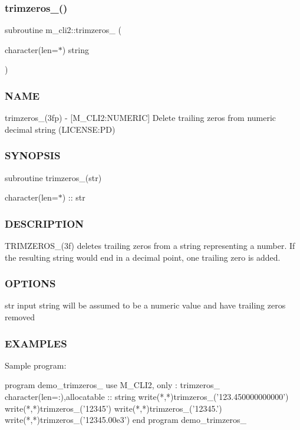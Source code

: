 \subsubsection{\texorpdfstring{trimzeros\+\_\+()}{trimzeros\_()}}
{\footnotesize\ttfamily subroutine m\+\_\+cli2\+::trimzeros\+\_\+ (\begin{DoxyParamCaption}\item[{character(len=$\ast$)}]{string }\end{DoxyParamCaption})\hspace{0.3cm}{\ttfamily [private]}}



\subsubsection*{N\+A\+ME}

trimzeros\+\_\+(3fp) -\/ \mbox{[}M\+\_\+\+C\+L\+I2\+:N\+U\+M\+E\+R\+IC\mbox{]} Delete trailing zeros from numeric decimal string (L\+I\+C\+E\+N\+SE\+:PD) \subsubsection*{S\+Y\+N\+O\+P\+S\+IS}

subroutine trimzeros\+\_\+(str)

character(len=$\ast$) \+:\+: str \subsubsection*{D\+E\+S\+C\+R\+I\+P\+T\+I\+ON}

T\+R\+I\+M\+Z\+E\+R\+O\+S\+\_\+(3f) deletes trailing zeros from a string representing a number. If the resulting string would end in a decimal point, one trailing zero is added. \subsubsection*{O\+P\+T\+I\+O\+NS}

str input string will be assumed to be a numeric value and have trailing zeros removed \subsubsection*{E\+X\+A\+M\+P\+L\+ES}

Sample program\+: \begin{DoxyVerb}  program demo_trimzeros_
  use M_CLI2, only : trimzeros_
  character(len=:),allocatable :: string
     write(*,*)trimzeros_('123.450000000000')
     write(*,*)trimzeros_('12345')
     write(*,*)trimzeros_('12345.')
     write(*,*)trimzeros_('12345.00e3')
  end program demo_trimzeros_
\end{DoxyVerb}


